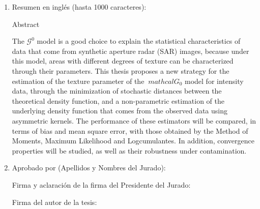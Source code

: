 \begin{enumerate}
	\item Resumen en inglés (hasta 1000 caracteres):
	
	Abstract
	
	The $\mathcal{G}^0$ model is a good choice to explain the statistical characteristics of data that come from synthetic aperture radar (SAR) images, because under this model, areas with different degrees of texture can be characterized through their parameters. This thesis proposes a new strategy for the estimation of the texture parameter of the $ \ mathcal G_0 $ model for intensity data, through the minimization of stochastic distances between the theoretical density function, and a non-parametric estimation of the underlying density function that comes from the observed data using asymmetric kernels. The performance of these estimators will be compared, in terms of bias and mean square error, with those obtained by the Method of Moments, Maximum Likelihood and Logcumulantes. In addition, convergence properties will be studied, as well as their robustness under contamination.

\item Aprobado por (Apellidos y Nombres del Jurado):

\bigskip\bigskip\bigskip\bigskip

Firma y aclaración de la firma del Presidente del Jurado:				

\bigskip\bigskip\bigskip\bigskip

Firma del autor de la tesis:

\end{enumerate}

\newpage
	

